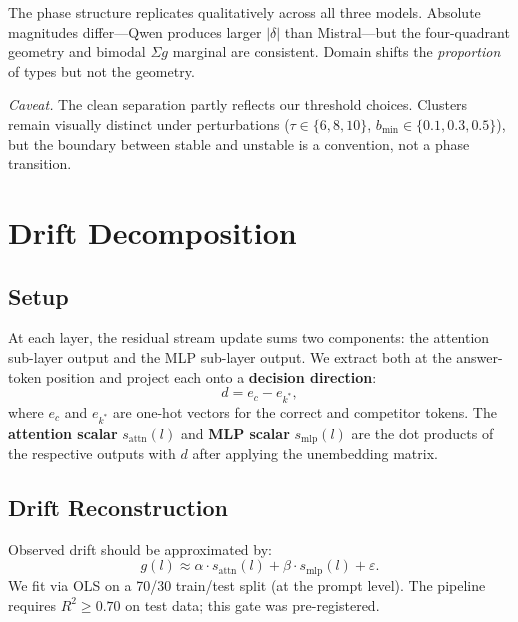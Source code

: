 \documentclass{article}
\begin{document}
The phase structure replicates qualitatively across all three models.  Absolute magnitudes differ---Qwen produces larger $|\delta|$ than Mistral---but the four-quadrant geometry and bimodal $\Sigma g$ marginal are consistent.  Domain shifts the \emph{proportion} of types but not the geometry.

\emph{Caveat.}  The clean separation partly reflects our threshold choices.  Clusters remain visually distinct under perturbations ($\tau \in \{6, 8, 10\}$, $b_{\min} \in \{0.1, 0.3, 0.5\}$), but the boundary between stable and unstable is a convention, not a phase transition.


\section{Drift Decomposition}
\label{sec:decomposition}

\subsection{Setup}

At each layer, the residual stream update sums two components: the attention sub-layer output and the MLP sub-layer output.  We extract both at the answer-token position and project each onto a \textbf{decision direction}:
\begin{equation}
  d = e_c - e_{k^*},
  \label{eq:direction}
\end{equation}
where $e_c$ and $e_{k^*}$ are one-hot vectors for the correct and competitor tokens.  The \textbf{attention scalar} $s_{\mathrm{attn}}(l)$ and \textbf{MLP scalar} $s_{\mathrm{mlp}}(l)$ are the dot products of the respective outputs with $d$ after applying the unembedding matrix.

\subsection{Drift Reconstruction}

Observed drift should be approximated by:
\begin{equation}
  g(l) \approx \alpha \cdot s_{\mathrm{attn}}(l) + \beta \cdot s_{\mathrm{mlp}}(l) + \varepsilon.
  \label{eq:decomposition}
\end{equation}
We fit via OLS on a 70/30 train/test split (at the prompt level).  The pipeline requires $R^2 \geq 0.70$ on test data; this gate was pre-registered.
\end{document}
